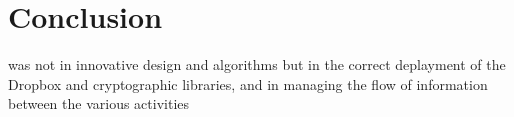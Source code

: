 
\chapter{Conclusion}
\label{cha:conclusion}
 was not in innovative design and algorithms but in the correct deplayment of the Dropbox and cryptographic libraries, and in managing the flow of information between the various activities